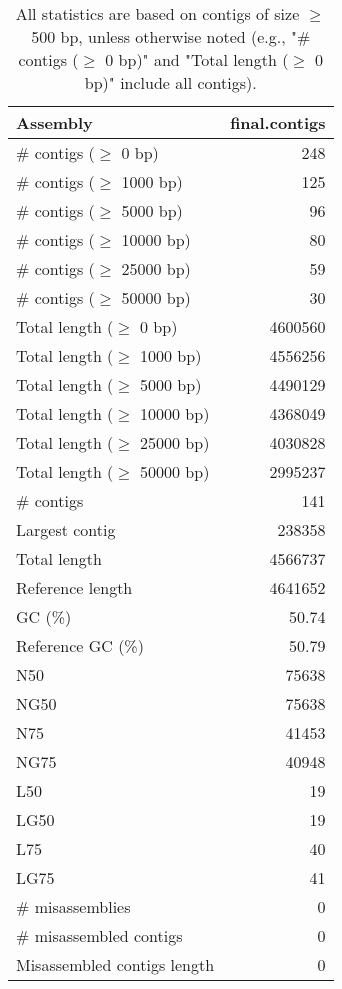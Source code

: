\documentclass[12pt,a4paper]{article}
\begin{document}
\begin{table}[ht]
\begin{center}
\caption{All statistics are based on contigs of size $\geq$ 500 bp, unless otherwise noted (e.g., "\# contigs ($\geq$ 0 bp)" and "Total length ($\geq$ 0 bp)" include all contigs).}
\begin{tabular}{|l*{1}{|r}|}
\hline
Assembly & final.contigs \\ \hline
\# contigs ($\geq$ 0 bp) & 248 \\ \hline
\# contigs ($\geq$ 1000 bp) & 125 \\ \hline
\# contigs ($\geq$ 5000 bp) & 96 \\ \hline
\# contigs ($\geq$ 10000 bp) & 80 \\ \hline
\# contigs ($\geq$ 25000 bp) & 59 \\ \hline
\# contigs ($\geq$ 50000 bp) & 30 \\ \hline
Total length ($\geq$ 0 bp) & 4600560 \\ \hline
Total length ($\geq$ 1000 bp) & 4556256 \\ \hline
Total length ($\geq$ 5000 bp) & 4490129 \\ \hline
Total length ($\geq$ 10000 bp) & 4368049 \\ \hline
Total length ($\geq$ 25000 bp) & 4030828 \\ \hline
Total length ($\geq$ 50000 bp) & 2995237 \\ \hline
\# contigs & 141 \\ \hline
Largest contig & 238358 \\ \hline
Total length & 4566737 \\ \hline
Reference length & 4641652 \\ \hline
GC (\%) & 50.74 \\ \hline
Reference GC (\%) & 50.79 \\ \hline
N50 & 75638 \\ \hline
NG50 & 75638 \\ \hline
N75 & 41453 \\ \hline
NG75 & 40948 \\ \hline
L50 & 19 \\ \hline
LG50 & 19 \\ \hline
L75 & 40 \\ \hline
LG75 & 41 \\ \hline
\# misassemblies & 0 \\ \hline
\# misassembled contigs & 0 \\ \hline
Misassembled contigs length & 0 \\ \hline

\end{tabular}
\end{center}
\end{table}
\end{document}
